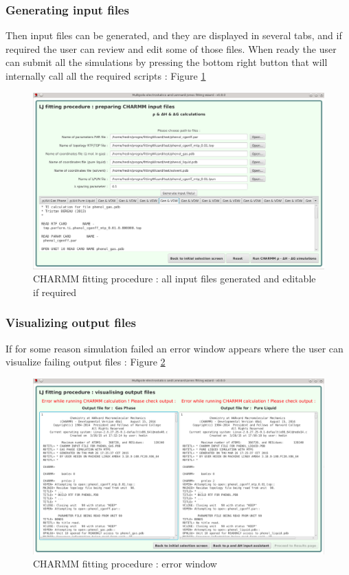 \documentclass[12pt,a4paper]{article}
\begin{document}
\subsubsection{Generating input files}

Then input files can be generated, and they are displayed in several tabs, and if required the user 
can review and edit some of those files. When ready the user can submit all the simulations by 
pressing the bottom right button that will internally call all the required scripts : Figure 
\ref{fig5} \\

\begin{figure}[h!]
\centering
\includegraphics[width=0.9\linewidth]{pics/scr5}
\caption{CHARMM fitting procedure : all input files generated and editable if required}
\label{fig5}
\end{figure}

\subsubsection{Visualizing output files}

If for some reason simulation failed an error window appears where the user can visualize failing 
output files : Figure \ref{fig6} \\

\begin{figure}[h!]
\centering
\includegraphics[width=0.9\linewidth]{pics/scr6}
\caption{CHARMM fitting procedure : error window}
\label{fig6}
\end{figure}
\end{document}
